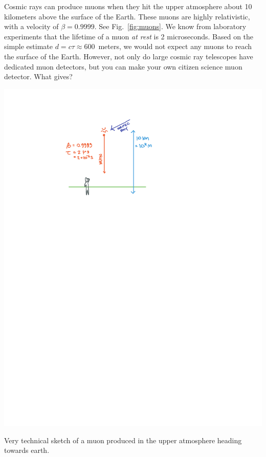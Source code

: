 \documentclass[12pt, oneside]{report}    %
\begin{document}
Cosmic rays can produce muons when they hit the upper atmosphere about 10 kilometers above the surface of the Earth. These muons are highly relativistic, with a velocity of $\beta = 0.9999$. See Fig.~\ref{fig:muons}. We know from laboratory experiments that the lifetime of a muon \emph{at rest} is 2 microseconds. Based on the simple estimate $d=c\tau \approx 600$~meters, we would not expect any muons to reach the surface of the Earth. However, not only do large cosmic ray telescopes have dedicated muon detectors, but you can make your own citizen science muon detector. What gives?
\begin{marginfigure}%
    \includegraphics[width=\textwidth]{figures/muon.pdf}
    \caption{Very technical sketch of a muon produced in the upper atmosphere heading towards earth. \label{fig:muons}} 
\end{marginfigure}
\end{document}
